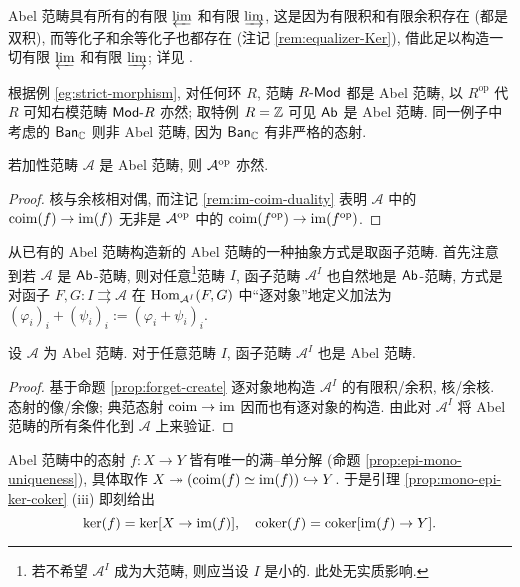 \begin{remark}\label{rem:Abel-cat-finite-lim}
	Abel 范畴具有所有的有限 $\varprojlim$ 和有限 $\varinjlim$, 这是因为有限积和有限余积存在 (都是双积), 而等化子和余等化子也都存在 (注记 \ref{rem:equalizer-Ker}), 借此足以构造一切有限 $\varprojlim$ 和有限 $\varinjlim$; 详见 \cite[定理 2.8.3]{Li1}.
\end{remark}

根据例 \ref{eg:strict-morphism}, 对任何环 $R$, 范畴 $R\text{-}\mathsf{Mod}$ 都是 Abel 范畴, 以 $R^{\text{op}}$ 代 $R$ 可知右模范畴 $\mathsf{Mod}\text{-}R$ 亦然; 取特例 $R = \mathbb{Z}$ 可见 $\mathsf{Ab}$ 是 Abel 范畴. 同一例子中考虑的 $\mathsf{Ban}_{\mathbb{C}}$ 则非 Abel 范畴, 因为 $\mathsf{Ban}_{\mathbb{C}}$ 有非严格的态射.

\begin{proposition}\label{prop:abelian-cat-duality}
	若加性范畴 $\mathcal{A}$ 是 Abel 范畴, 则 $\mathcal{A}^{\operatorname{op}}$ 亦然.
\end{proposition}
\begin{proof}
	核与余核相对偶, 而注记 \ref{rem:im-coim-duality} 表明 $\mathcal{A}$ 中的 $\operatorname{coim}(f) \to \operatorname{im}(f)$ 无非是 $\mathcal{A}^{\operatorname{op}}$ 中的 $\operatorname{coim}(f^{\operatorname{op}}) \to \operatorname{im}(f^{\operatorname{op}})$.
\end{proof}

从已有的 Abel 范畴构造新的 Abel 范畴的一种抽象方式是取函子范畴. 首先注意到若 $\mathcal{A}$ 是 $\mathsf{Ab}$-范畴, 则对任意\footnote{若不希望 $\mathcal{A}^I$ 成为大范畴, 则应当设 $I$ 是小的. 此处无实质影响.}范畴 $I$, 函子范畴 $\mathcal{A}^I$ 也自然地是 $\mathsf{Ab}$-范畴, 方式是对函子 $F, G: I \rightrightarrows \mathcal{A}$ 在 $\operatorname{Hom}_{\mathcal{A}^I}(F, G)$ 中``逐对象''地定义加法为 $(\varphi_i)_i + (\psi_i)_i := (\varphi_i + \psi_i)_i$.

\begin{proposition}\label{prop:functor-cat-Abel}
	设 $\mathcal{A}$ 为 Abel 范畴. 对于任意范畴 $I$, 函子范畴 $\mathcal{A}^I$ 也是 Abel 范畴.
\end{proposition}
\begin{proof}
	基于命题 \ref{prop:forget-create} 逐对象地构造 $\mathcal{A}^I$ 的有限积/余积, 核/余核. 态射的像/余像; 典范态射 $\operatorname{coim} \to \operatorname{im}$ 因而也有逐对象的构造. 由此对 $\mathcal{A}^I$ 将 Abel 范畴的所有条件化到 $\mathcal{A}$ 上来验证.
\end{proof}

Abel 范畴中的态射 $f: X \to Y$ 皆有唯一的满--单分解 (命题 \ref{prop:epi-mono-uniqueness}), 具体取作 $X \twoheadrightarrow \left(\operatorname{coim}(f) \simeq \operatorname{im}(f)\right) \hookrightarrow Y$. 于是引理 \ref{prop:mono-epi-ker-coker} (iii) 即刻给出
\[ \operatorname{ker}(f) = \operatorname{ker}[X \to \operatorname{im}(f)], \quad \operatorname{coker}(f) = \operatorname{coker}[\operatorname{im}(f) \to Y]. \]

